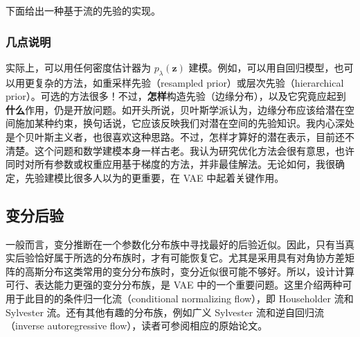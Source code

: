 下面给出一种基于流的先验的实现。

\subsubsection{几点说明}
实际上，可以用任何密度估计器为 $p_\lambda(\mathbf{z})$ 建模。例如，可以用自回归模型，也可以用更复杂的方法，如重采样先验（resampled prior）或层次先验（hierarchical prior）。可选的方法很多！不过，\textbf{怎样}构造先验（边缘分布），以及它究竟应起到\textbf{什么}作用，仍是开放问题。如开头所说，贝叶斯学派认为，边缘分布应该给潜在空间施加某种约束，换句话说，它应该反映我们对潜在空间的先验知识。我内心深处是个贝叶斯主义者，也很喜欢这种思路。不过，怎样才算好的潜在表示，目前还不清楚。这个问题和数学建模本身一样古老。我认为研究优化方法会很有意思，也许同时对所有参数或权重应用基于梯度的方法，并非最佳解法。无论如何，我很确定，先验建模比很多人以为的更重要，在 VAE 中起着关键作用。

\subsection{变分后验}
\label{sec:vae-posteriors}
一般而言，变分推断在一个参数化分布族中寻找最好的后验近似。因此，只有当真实后验恰好属于所选的分布族时，才有可能恢复它。尤其是采用具有对角协方差矩阵的高斯分布这类常用的变分分布族时，变分近似很可能不够好。所以，设计计算可行、表达能力更强的变分分布族，是 VAE 中的一个重要问题。这里介绍两种可用于此目的的条件归一化流（conditional normalizing flow），即 Householder 流和 Sylvester 流。还有其他有趣的分布族，例如广义 Sylvester 流和逆自回归流（inverse autoregressive flow），读者可参阅相应的原始论文。

